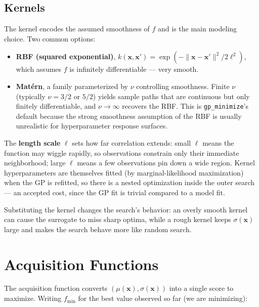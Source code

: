 \documentclass[conference]{IEEEtran}
\begin{document}
\subsection*{Kernels}
The kernel encodes the assumed smoothness of $f$ and is the main modeling choice. Two common options:
\begin{itemize}
    \item \textbf{RBF (squared exponential)}, $k(\mathbf{x},\mathbf{x}') = \exp\!\left(-\|\mathbf{x}-\mathbf{x}'\|^2 / 2\ell^2\right)$, which assumes $f$ is infinitely differentiable --- very smooth.
    \item \textbf{Mat\'ern}, a family parameterized by $\nu$ controlling smoothness. Finite $\nu$ (typically $\nu = 3/2$ or $5/2$) yields sample paths that are continuous but only finitely differentiable, and $\nu \to \infty$ recovers the RBF. This is \texttt{gp\_minimize}'s default because the strong smoothness assumption of the RBF is usually unrealistic for hyperparameter response surfaces.
\end{itemize}
The \textbf{length scale} $\ell$ sets how far correlation extends: small $\ell$ means the function may wiggle rapidly, so observations constrain only their immediate neighborhood; large $\ell$ means a few observations pin down a wide region. Kernel hyperparameters are themselves fitted (by marginal-likelihood maximization) when the GP is refitted, so there is a nested optimization inside the outer search --- an accepted cost, since the GP fit is trivial compared to a model fit.

Substituting the kernel changes the search's behavior: an overly smooth kernel can cause the surrogate to miss sharp optima, while a rough kernel keeps $\sigma(\mathbf{x})$ large and makes the search behave more like random search.

\section*{Acquisition Functions}
The acquisition function converts $(\mu(\mathbf{x}), \sigma(\mathbf{x}))$ into a single score to maximize. Writing $f_{\min}$ for the best value observed so far (we are minimizing):
\end{document}
